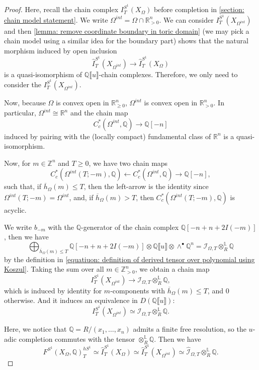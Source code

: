 \documentclass[11pt]{amsart}
\numberwithin{equation}{section}
\theoremstyle{plain}
\theoremstyle{definition}
\theoremstyle{remark}
\newcommand{\bQ} { {\mathbb{Q}}}
\newcommand{\bZ} { {\mathbb{Z}}}
\newcommand{\bR} { {\mathbb{R}}}
\newcommand{\fpw}[1]{{\llbracket #1\rrbracket}}
\begin{document}
\begin{proof}
Here, recall the chain complex $I^{S^1}_T(X_\Omega)$ before completion in \autoref{section: chain model statement}. We write $\Omega^{int}=\Omega\cap \bR^n_{>0}$. We can consider $I^{S^1}_T(X_{\Omega^{int}})$ and then \autoref{lemma: remove coordinate boundary in toric domain} (we may pick a chain model using a similar idea for the boundary part) shows that the natural morphism induced by open inclusion
\[\widehat I^{S^1}_T(X_{\Omega^{int}})\to \widehat I^{S^1}_T(X_{\Omega})\]
is a quasi-isomorphism of $\bQ\fpw{u}$-chain complexes. Therefore, we only need to consider the $I^{S^1}_T(X_{\Omega^{int}})$. 

Now, because $\Omega$ is convex open in $\bR^n_{\geq 0}$, ${\Omega^{int}}$ is convex open in $\bR^n_{>0}$. In particular, $\Omega^{int}\cong \bR^n$ and the chain map
\[C^*_c(\Omega^{int},\bQ) \to \bQ[-n]\]
induced by pairing with the (locally compact) fundamental class of $\bR^n$ is a quasi-isomorphism. 

Now, for $m\in \bZ^n$ and $T\geq 0$, we have two chain maps
\[ C^*_c(\Omega^{int}(T;-m),\bQ)\leftarrow  C^*_c(\Omega^{int},\bQ) \to \bQ[-n],\]
such that, if $\overline{h}_\Omega(m)\leq  T$, then the left-arrow is the identity since $\Omega^{int}(T;-m)=\Omega^{int}$, and, if  $\overline{h}_\Omega(m) > T$, then $C^*_c(\Omega^{int}(T;-m),\bQ)$ is acyclic.

We write $b_{-m}$ with the $\bQ$-generator of the chain complex $\bQ[-n+n+2I(-m)]$, then we have 
\[\bigoplus_{\overline{h}_\Omega(m)\leq  T}
\bQ[-n+n+2I(-m)]\otimes \bQ\fpw{u} \otimes \wedge^\bullet \bQ ^n = {\mathcal{I}}_{\Omega,T}\otimes^\mathbb{L}_R\bQ\]
by the definition in \autoref{equatiuon: definition of derived tensor over polynomial using Koszul}.
Taking the sum over all $m\in \mathbb{Z}^n_{>0}$, we  obtain a chain map
\[I^{S^1}_T(X_{\Omega^{int}})   \to {\mathcal{I}}_{\Omega,T}\otimes^\mathbb{L}_R\bQ ,\]
which is induced by identity for $m$-components with $\overline{h}_\Omega(m)\leq  T$, and $0$ otherwise. And it induces an equivalence in $D(\bQ\fpw{u})$:
\[I^{S^1}_T(X_{\Omega^{int}})  \simeq {\mathcal{I}}_{\Omega,T}\otimes^\mathbb{L}_R\bQ.\]

Here, we notice that $\bQ=R/(x_1,\dots,x_n)$ admits a finite free resolution, so the $u$-adic completion commutes with the tensor $\otimes^\mathbb{L}_R\bQ$. Then we have
\[F^{S^1}(X_{\Omega},\bQ)_T^{hS^1}\simeq \widehat{I}^{S^1}_T(X_{\Omega})\simeq \widehat{I}^{S^1}_T(X_{\Omega^{int}})  \simeq \widehat{\mathcal{I}}_{\Omega,T}\otimes^\mathbb{L}_R\bQ.\]


\end{proof}
\end{document}
